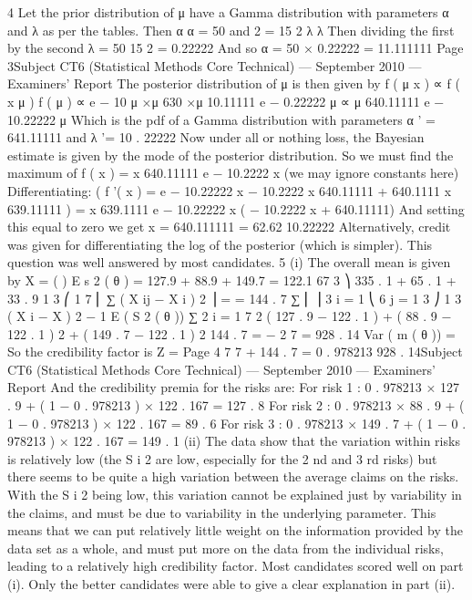 4
Let the prior distribution of μ have a Gamma distribution with parameters α and λ
as per the tables.
Then
α
α
= 50 and 2 = 15 2
λ
λ
Then dividing the first by the second λ =
50
15 2
= 0.22222
And so α = 50 × 0.22222 = 11.111111
Page 3Subject CT6 (Statistical Methods Core Technical) — September 2010 — Examiners’ Report
The posterior distribution of μ is then given by
f ( μ x ) ∝ f ( x μ ) f ( μ )
∝ e − 10 μ ×μ 630 ×μ 10.11111 e − 0.22222 μ
∝ μ 640.11111 e − 10.22222 μ
Which is the pdf of a Gamma distribution with parameters α ' = 641.11111 and
λ '= 10 . 22222
Now under all or nothing loss, the Bayesian estimate is given by the mode of the
posterior distribution. So we must find the maximum of
f ( x ) = x 640.11111 e − 10.2222 x (we may ignore constants here)
Differentiating:
(
f '( x ) = e − 10.22222 x − 10.2222 x 640.11111 + 640.1111 x 639.11111
)
= x 639.1111 e − 10.22222 x ( − 10.2222 x + 640.11111)
And setting this equal to zero we get
x =
640.111111
= 62.62
10.22222
Alternatively, credit was given for differentiating the log of the posterior (which is simpler).
This question was well answered by most candidates.
5
(i)
The overall mean is given by X =
(
)
E s 2 ( θ ) =
127.9 + 88.9 + 149.7
= 122.1 67
3
⎞ 335 . 1 + 65 . 1 + 33 . 9
1 3 ⎛ 1 7
⎜ ∑ ( X ij − X i ) 2 ⎟ =
= 144 . 7
∑
⎜
⎟
3 i = 1 ⎝ 6 j = 1
3
⎠
1 3
( X i − X ) 2 − 1 E ( S 2 ( θ ))
∑
2 i = 1
7
2
( 127 . 9 − 122 . 1 ) + ( 88 . 9 − 122 . 1 ) 2 + ( 149 . 7 − 122 . 1 ) 2 144 . 7
=
−
2
7
= 928 . 14
Var ( m ( θ )) =
So the credibility factor is Z =
Page 4
7
7 + 144 . 7
= 0 . 978213
928 . 14Subject CT6 (Statistical Methods Core Technical) — September 2010 — Examiners’ Report
And the credibility premia for the risks are:
For risk 1 : 0 . 978213 × 127 . 9 + ( 1 − 0 . 978213 ) × 122 . 167 = 127 . 8
For risk 2 : 0 . 978213 × 88 . 9 + ( 1 − 0 . 978213 ) × 122 . 167 = 89 . 6
For risk 3 : 0 . 978213 × 149 . 7 + ( 1 − 0 . 978213 ) × 122 . 167 = 149 . 1
(ii)
The data show that the variation within risks is relatively low (the S i 2 are low,
especially for the 2 nd and 3 rd risks) but there seems to be quite a high variation
between the average claims on the risks.
With the S i 2 being low, this variation cannot be explained just by variability
in the claims, and must be due to variability in the underlying parameter.
This means that we can put relatively little weight on the information provided
by the data set as a whole, and must put more on the data from the individual
risks, leading to a relatively high credibility factor.
Most candidates scored well on part (i). Only the better candidates were able to give a clear
explanation in part (ii).
